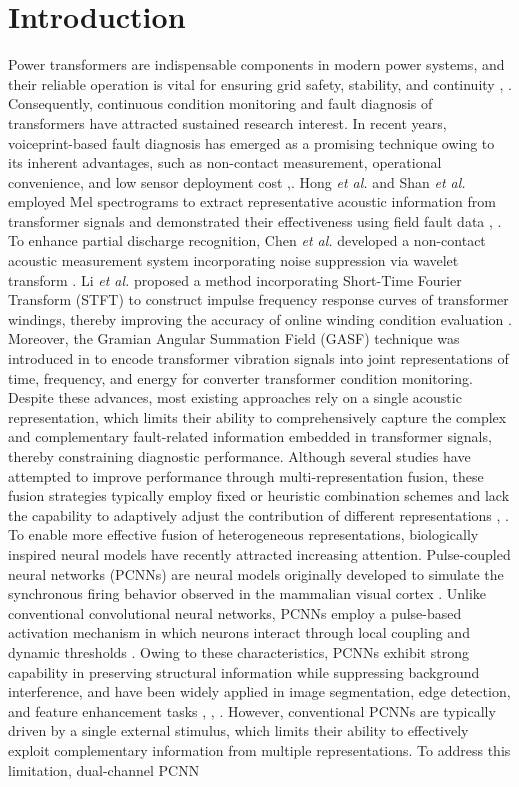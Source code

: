 \documentclass[anonymous]{iopjournal}
\begin{document}
\section{Introduction}
Power transformers are indispensable components in modern power systems, and their reliable operation is vital for ensuring grid safety, stability, and continuity \cite{10491111}, \cite{7480687}. Consequently, continuous condition monitoring and fault diagnosis of transformers have attracted sustained research interest. In recent years, voiceprint-based fault diagnosis has emerged as a promising technique owing to its inherent advantages, such as non-contact measurement, operational convenience, and low sensor deployment cost \cite{10492658},\cite{NIU2025127997}. Hong \emph{et al.} and Shan \emph{et al.} employed Mel spectrograms to extract representative acoustic information from transformer signals and demonstrated their effectiveness using field fault data \cite{SHAN2023112408}, \cite{10606641}. To enhance partial discharge recognition, Chen \emph{et al.} developed a non-contact acoustic measurement system incorporating noise suppression via wavelet transform \cite{4265659}. Li \emph{et al.} proposed a method incorporating Short-Time Fourier Transform (STFT) to construct impulse frequency response curves of transformer windings, thereby improving the accuracy of online winding condition evaluation \cite{7558591}. Moreover, the Gramian Angular Summation Field (GASF) technique was introduced in \cite{9760386} to encode transformer vibration signals into joint representations of time, frequency, and energy for converter transformer condition monitoring. Despite these advances, most existing approaches rely on a single acoustic representation, which limits their ability to comprehensively capture the complex and complementary fault-related information embedded in transformer signals, thereby constraining diagnostic performance. Although several studies have attempted to improve performance through multi-representation fusion, these fusion strategies typically employ fixed or heuristic combination schemes and lack the capability to adaptively adjust the contribution of different representations \cite{9408662}, \cite{9832890}. To enable more effective fusion of heterogeneous representations, biologically inspired neural models have recently attracted increasing attention. Pulse-coupled neural networks (PCNNs) are neural models originally developed to simulate the synchronous firing behavior observed in the mammalian visual cortex \cite{4305279,6338347}. Unlike conventional convolutional neural networks, PCNNs employ a pulse-based activation mechanism in which neurons interact through local coupling and dynamic thresholds \cite{8742596}. Owing to these characteristics, PCNNs exhibit strong capability in preserving structural information while suppressing background interference, and have been widely applied in image segmentation, edge detection, and feature enhancement tasks \cite{9444355}, \cite{10848019}, \cite{8746999}. However, conventional PCNNs are typically driven by a single external stimulus, which limits their ability to effectively exploit complementary information from multiple representations. To address this limitation, dual-channel PCNN 
\end{document}
